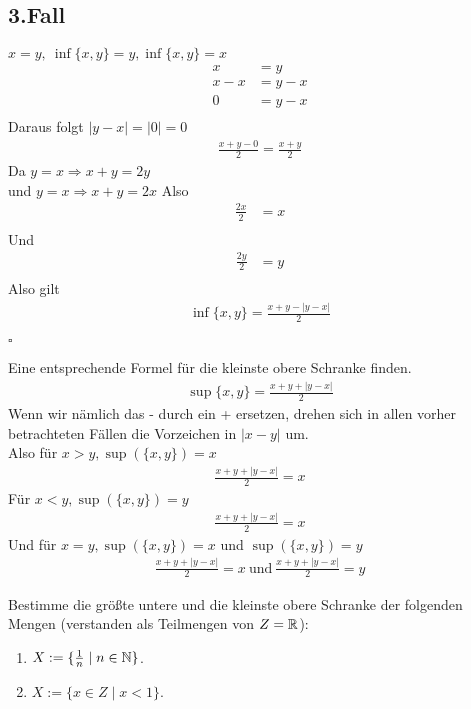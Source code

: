 \begin{lsg}
\subsection*{3.Fall} 
$x=y, \ \inf\{x,y\}=y, \inf\{x,y\}=x$
\begin{align*}
    x&=y \\
    x-x&=y-x \\
    0&=y-x \\
\end{align*}
Daraus folgt $|y-x|=|0|=0$
\begin{align*}
    \frac{x+y-0}{2}=\frac{x+y}{2}
\end{align*}
Da $y=x \Rightarrow x+y=2y$ \\
und $y=x \Rightarrow x+y=2x$
Also
\begin{align*}
    \frac{2x}{2}&=x\\
\end{align*}
Und 
\begin{align*}
    \frac{2y}{2}&=y\\
\end{align*}
Also gilt
\begin{align*}
    \inf\{x,y\}=\frac{x+y-|y-x|}{2}
\end{align*}
\begin{flushright}
$\square$
\end{flushright}
Eine entsprechende Formel für die kleinste obere Schranke finden. \\
\begin{align*}
    \sup\{x,y\}=\frac{x+y+|y-x|}{2}
\end{align*}
Wenn wir nämlich das - durch ein + ersetzen, drehen sich in allen vorher betrachteten Fällen die Vorzeichen in $|x-y|$ um.\\
Also für $x>y, \sup(\{x,y\})=x$
\begin{align*}
    \frac{x+y+|y-x|}{2}=x
\end{align*}
Für $x<y, \sup(\{x,y\})=y$
\begin{align*}
    \frac{x+y+|y-x|}{2}=x
\end{align*}
Und für $x=y, \sup(\{x,y\})=x$ und $\sup(\{x,y\})=y$
\begin{align*}
    \frac{x+y+|y-x|}{2}=x \ \text{und} \ \frac{x+y+|y-x|}{2}=y
\end{align*}
\end{lsg}


\bigskip


\begin{aufg}[6 Punkte]
Bestimme die gr\"o{\ss}te untere und die kleinste obere Schranke der folgenden Mengen (verstanden als Teilmengen von $Z=\mathbb{R}$):
\begin{enumerate}[label=$\mathrm{(\roman*)}$, ref=$\mathrm{\roman*}$]
\item $X:=\{ \frac{1}{n} \mid n\in \mathbb{N}\}$.
\item $X:=\{ x \in Z \mid x < 1 \}$.
\end{enumerate}
\end{aufg}
 
